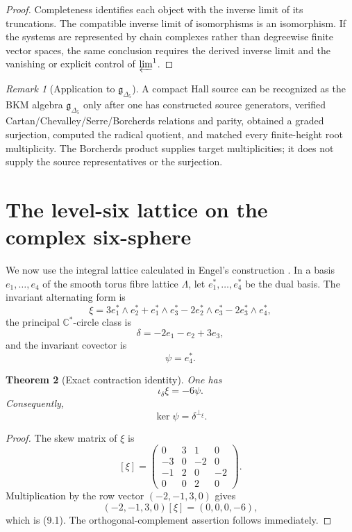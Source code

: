 \documentclass[11pt]{article}
\newtheorem{theorem}{Theorem}[section]
\theoremstyle{definition}
\theoremstyle{remark}
\newtheorem{remark}[theorem]{Remark}
\newcommand{\CC}{\mathbb C}
\newcommand{\1}{\mathbf 1}
\begin{document}
\begin{proof}
Completeness identifies each object with the inverse limit of its truncations.  The compatible inverse limit of isomorphisms is an isomorphism.  If the systems are represented by chain complexes rather than degreewise finite vector spaces, the same conclusion requires the derived inverse limit and the vanishing or explicit control of $\varprojlim^1$.
\end{proof}

\begin{remark}[Application to $\mathfrak g_{\Delta_5}$]
A compact Hall source can be recognized as the BKM algebra $\mathfrak g_{\Delta_5}$ only after one has constructed source generators, verified Cartan/Chevalley/Serre/Borcherds relations and parity, obtained a graded surjection, computed the radical quotient, and matched every finite-height root multiplicity.  The Borcherds product supplies target multiplicities; it does not supply the source representatives or the surjection.
\end{remark}

\section{The level-six lattice on the complex six-sphere}

We now use the integral lattice calculated in Engel's construction \cite{Engel2026}.  In a basis $e_1,\ldots,e_4$ of the smooth torus fibre lattice $\Lambda$, let $e_1^*,\ldots,e_4^*$ be the dual basis.  The invariant alternating form is
\[
\xi
=
3e_1^*\wedge e_2^*
+e_1^*\wedge e_3^*
-2e_2^*\wedge e_3^*
-2e_3^*\wedge e_4^*,
\]
the principal $\CC^*$-circle class is
\[
\delta=-2e_1-e_2+3e_3,
\]
and the invariant covector is
\[
\psi=e_4^*.
\]

\begin{theorem}[Exact contraction identity]
One has
\[
\iota_\delta\xi=-6\psi.
\tag{9.1}
\]
Consequently,
\[
\ker\psi=\delta^{\perp_\xi}.
\]
\end{theorem}

\begin{proof}
The skew matrix of $\xi$ is
\[
[\xi]=
\begin{pmatrix}
0&3&1&0\\
-3&0&-2&0\\
-1&2&0&-2\\
0&0&2&0
\end{pmatrix}.
\]
Multiplication by the row vector $(-2,-1,3,0)$ gives
\[
(-2,-1,3,0)[\xi]=(0,0,0,-6),
\]
which is (9.1).  The orthogonal-complement assertion follows immediately.
\end{proof}
\end{document}
